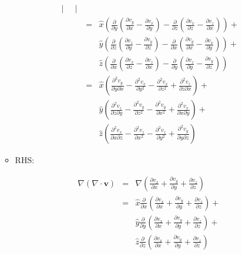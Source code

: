 \documentclass[12pt,a4paper,twoside]{article}
\numberwithin{equation}{section}
\begin{document}
\begin{enumerate}
\begin{itemize}
\begin{eqnarray*}
\begin{vmatrix}
				\end{vmatrix}\\
				&=& \hat{x}\left(\frac{\partial}{\partial y}\left(\frac{\partial v_y}{\partial x}-\frac{\partial v_x}{\partial y}\right)-\frac{\partial}{\partial z}\left(\frac{\partial v_x}{\partial z}-\frac{\partial v_z}{\partial x}\right)\right) +\\
				& & \hat{y}\left(\frac{\partial}{\partial z}\left(\frac{\partial v_z}{\partial y}-\frac{\partial v_y}{\partial z}\right)-\frac{\partial}{\partial x}\left(\frac{\partial v_y}{\partial x}-\frac{\partial v_x}{\partial y}\right)\right) +\\
				& & \hat{z}\left(\frac{\partial}{\partial x}\left(\frac{\partial v_x}{\partial z}-\frac{\partial v_z}{\partial x}\right)-\frac{\partial }{\partial y}\left(
				\frac{\partial v_z}{\partial y}-\frac{\partial v_y}{\partial z}\right)\right)\\
				&=& \hat{x}\left(\frac{\partial^2 v_y}{\partial y\partial x}-\frac{\partial^2 v_x}{\partial y^2}-\frac{\partial^2 v_x}{\partial z^2}+\frac{\partial^2 v_z}{\partial z\partial x}\right) + \\
				& & \hat{y}\left(\frac{\partial^2v_z}{\partial z\partial y}-\frac{\partial^2v_y}{\partial z^2}-\frac{\partial^2v_y}{\partial x^2}+\frac{\partial^2v_x}{\partial x\partial y}\right) + \\
				& & \hat{z}\left(\frac{\partial^2 v_x}{\partial x\partial z}-\frac{\partial^2v_z}{\partial x^2}-\frac{\partial^2v_z}{\partial y^2}+\frac{\partial^2 v_y}{\partial y\partial z}\right)
			\end{eqnarray*}
			\item RHS:
			
			\begin{eqnarray*}
				\nabla (\nabla \cdot \textbf{v}) &=& \nabla (\frac{\partial v_x}{\partial x}+\frac{\partial v_y}{\partial y}+\frac{\partial v_z}{\partial z}) \\
				&=& \hat{x}\frac{\partial}{\partial x}\left(\frac{\partial v_x}{\partial x}+\frac{\partial v_y}{\partial y}+\frac{\partial v_z}{\partial z}\right)+\\
				& &\hat{y}\frac{\partial}{\partial y}\left(\frac{\partial v_x}{\partial x}+\frac{\partial v_y}{\partial y}+\frac{\partial v_z}{\partial z}\right)+\\
				& &\hat{z}\frac{\partial}{\partial z}\left(\frac{\partial v_x}{\partial x}+\frac{\partial v_y}{\partial y}+\frac{\partial v_z}{\partial z}\right)
			\end{eqnarray*}
			

\end{itemize}
\end{enumerate}
\end{document}
